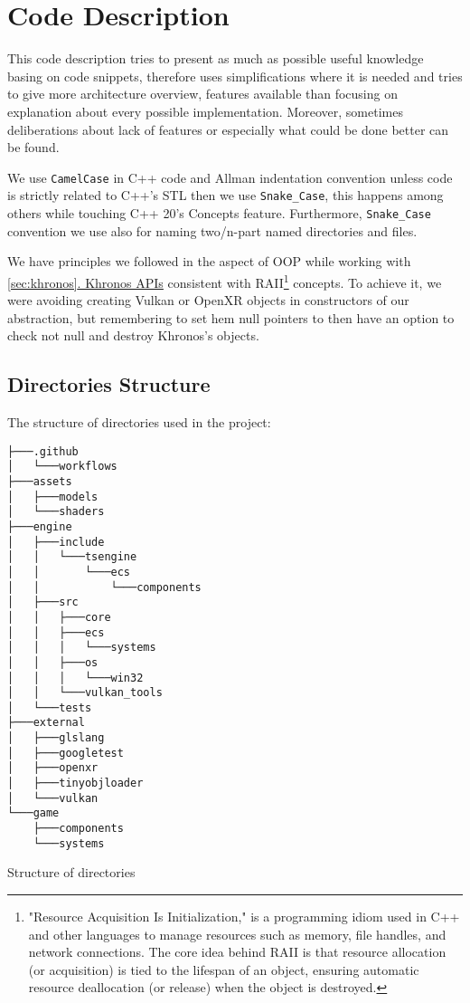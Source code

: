 \newpage
\section{Code Description}
\label{sec:code_descr}
This code description tries to present as much as possible useful knowledge basing on code snippets, therefore uses simplifications where it is needed and tries to give more architecture overview, features available than focusing on explanation about every possible implementation. Moreover, sometimes deliberations about lack of features or especially what could be done better can be found.

We use \texttt{CamelCase} in C++ code and Allman indentation convention unless code is strictly related to C++'s STL then we use \texttt{Snake\_Case}, this happens among others while touching C++ 20's Concepts feature.
Furthermore, \texttt{Snake\_Case} convention we use also for naming two/n-part named directories and files.

We have principles we followed in the aspect of OOP while working with \hyperref[sec:khronos]{\ref*{sec:khronos}. Khronos APIs} consistent with RAII\footnote{"Resource Acquisition Is Initialization," is a programming idiom used in C++ and other languages to manage resources such as memory, file handles, and network connections. The core idea behind RAII is that resource allocation (or acquisition) is tied to the lifespan of an object, ensuring automatic resource deallocation (or release) when the object is destroyed.} concepts. To achieve it, we were avoiding creating Vulkan or OpenXR objects in constructors of our abstraction, but remembering to set hem null pointers to then have an option to check not null and destroy Khronos's objects.
\subsection{Directories Structure}
The structure of directories used in the project:
\begin{verbatim}
├───.github
│   └───workflows
├───assets
│   ├───models
│   └───shaders
├───engine
│   ├───include
│   │   └───tsengine
│   │       └───ecs
│   │           └───components
│   ├───src
│   │   ├───core
│   │   ├───ecs
│   │   │   └───systems
│   │   ├───os
│   │   │   └───win32
│   │   └───vulkan_tools
│   └───tests
├───external
│   ├───glslang
│   ├───googletest
│   ├───openxr
│   ├───tinyobjloader
│   └───vulkan
└───game
    ├───components
    └───systems
\end{verbatim}
\begin{table}[h]
\caption{Structure of directories}
\end{table}

